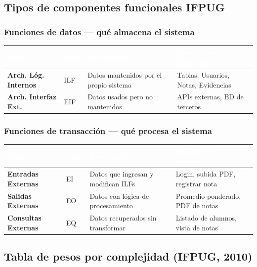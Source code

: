 \documentclass[12pt, a4paper]{article}
\begin{document}
\subsection{Tipos de componentes funcionales IFPUG}

\subsubsection{Funciones de datos — qué almacena el sistema}

\begin{tabular}{>{\bfseries}p{2.5cm} p{1cm} p{5cm} p{4cm}}
  \toprule
  \rowcolor{espeazul}
  \textcolor{white}{Tipo} & \textcolor{white}{Sigla} &
  \textcolor{white}{Descripción} & \textcolor{white}{Ejemplo en el proyecto} \\
  \midrule
  Arch. Lóg. Internos & ILF & Datos mantenidos por el propio sistema & Tablas: Usuarios, Notas, Evidencias \\
  Arch. Interfaz Ext. & EIF & Datos usados pero no mantenidos & APIs externas, BD de terceros \\
  \bottomrule
\end{tabular}

\subsubsection{Funciones de transacción — qué procesa el sistema}

\begin{tabular}{>{\bfseries}p{2.5cm} p{1cm} p{5cm} p{4cm}}
  \toprule
  \rowcolor{espeazul}
  \textcolor{white}{Tipo} & \textcolor{white}{Sigla} &
  \textcolor{white}{Descripción} & \textcolor{white}{Ejemplo en el proyecto} \\
  \midrule
  Entradas Externas  & EI & Datos que ingresan y modifican ILFs & Login, subida PDF, registrar nota \\
  Salidas Externas   & EO & Datos con lógica de procesamiento   & Promedio ponderado, PDF de notas \\
  Consultas Externas & EQ & Datos recuperados sin transformar   & Listado de alumnos, vista de notas \\
  \bottomrule
\end{tabular}

\subsection{Tabla de pesos por complejidad (IFPUG, 2010)}
\end{document}
